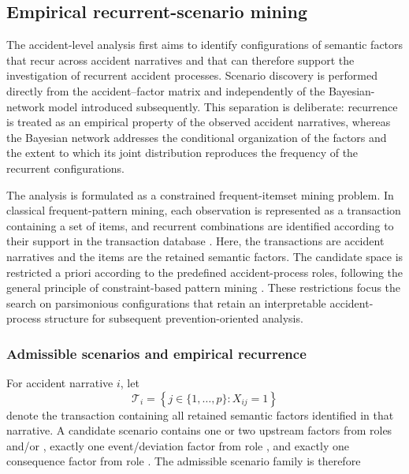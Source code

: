 \subsection{Empirical recurrent-scenario mining}
\label{sec:chap4_scenario_mining}

The accident-level analysis first aims to identify configurations of semantic
factors that recur across accident narratives and that can therefore support
the investigation of recurrent accident processes. Scenario discovery is
performed directly from the accident--factor matrix and independently of the
Bayesian-network model introduced subsequently. This separation is deliberate:
recurrence is treated as an empirical property of the observed accident
narratives, whereas the Bayesian network addresses the conditional organization
of the factors and the extent to which its joint distribution reproduces the
frequency of the recurrent configurations.

The analysis is formulated as a constrained frequent-itemset mining problem.
In classical frequent-pattern mining, each observation is represented as a
transaction containing a set of items, and recurrent combinations are
identified according to their support in the transaction database
\citep{agrawal1993mining}. Here, the transactions are accident narratives and
the items are the retained semantic factors. The candidate space is restricted
a priori according to the predefined accident-process roles, following the
general principle of constraint-based pattern mining
\citep{ng1998exploratory}. These restrictions focus the search on parsimonious
configurations that retain an interpretable accident-process structure for
subsequent prevention-oriented analysis.


\subsubsection{Admissible scenarios and empirical recurrence}
\label{sec:chap4_scenario_candidates}

For accident narrative \(i\), let
\[
\mathcal T_i
=
\left\{
j\in\{1,\ldots,p\}:X_{ij}=1
\right\}
\]
denote the transaction containing all retained semantic factors identified in
that narrative. A candidate scenario contains one or two upstream factors from
roles \roleAzero{} and/or \roleAone{}, exactly one event/deviation factor from
role \roleB{}, and exactly one consequence factor from role \roleC{}. The
admissible scenario family is therefore

